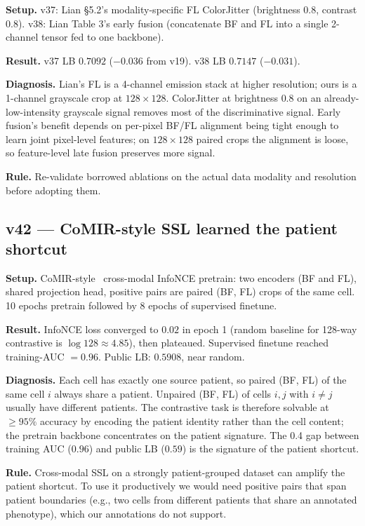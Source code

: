 \documentclass[conference]{IEEEtran}
\begin{document}
\textbf{Setup.} v37: Lian \S5.2's modality-specific FL ColorJitter (brightness $0.8$, contrast $0.8$). v38: Lian Table 3's early fusion (concatenate BF and FL into a single 2-channel tensor fed to one backbone).

\textbf{Result.} v37 LB $0.7092$ ($-0.036$ from v19). v38 LB $0.7147$ ($-0.031$).

\textbf{Diagnosis.} Lian's FL is a 4-channel emission stack at higher resolution; ours is a 1-channel grayscale crop at $128 \times 128$. ColorJitter at brightness $0.8$ on an already-low-intensity grayscale signal removes most of the discriminative signal. Early fusion's benefit depends on per-pixel BF/FL alignment being tight enough to learn joint pixel-level features; on $128 \times 128$ paired crops the alignment is loose, so feature-level late fusion preserves more signal.

\textbf{Rule.} Re-validate borrowed ablations on the actual data modality and resolution before adopting them.

\subsection{v42 --- CoMIR-style SSL learned the patient shortcut}

\textbf{Setup.} CoMIR-style~\cite{pielawski2020comir} cross-modal InfoNCE pretrain: two encoders (BF and FL), shared projection head, positive pairs are paired (BF, FL) crops of the same cell. 10 epochs pretrain followed by 8 epochs of supervised finetune.

\textbf{Result.} InfoNCE loss converged to $0.02$ in epoch 1 (random baseline for 128-way contrastive is $\log 128 \approx 4.85$), then plateaued. Supervised finetune reached training-AUC $= 0.96$. Public LB: $0.5908$, near random.

\textbf{Diagnosis.} Each cell has exactly one source patient, so paired (BF, FL) of the same cell $i$ always share a patient. Unpaired (BF, FL) of cells $i, j$ with $i \ne j$ usually have different patients. The contrastive task is therefore solvable at $\ge 95\%$ accuracy by encoding the patient identity rather than the cell content; the pretrain backbone concentrates on the patient signature. The 0.4 gap between training AUC ($0.96$) and public LB ($0.59$) is the signature of the patient shortcut.

\textbf{Rule.} Cross-modal SSL on a strongly patient-grouped dataset can amplify the patient shortcut. To use it productively we would need positive pairs that span patient boundaries (e.g., two cells from different patients that share an annotated phenotype), which our annotations do not support.
\end{document}
